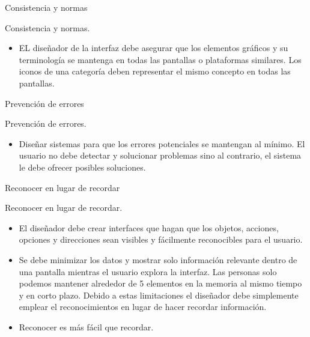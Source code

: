 \documentclass[aspectratio=169]{beamer}
\begin{document}
\begin{frame}{Consistencia y normas}
  
  \begin{block}{Consistencia y normas.}
  \begin{itemize}    
    \item EL diseñador de la interfaz debe asegurar que los elementos gráficos y su terminología se mantenga en todas las pantallas o plataformas similares. Los iconos de una categoría deben representar el mismo concepto en todas las pantallas.


  \end{itemize}
  \end{block}

\end{frame}
\begin{frame}{Prevención de errores}
  
  \begin{block}{Prevención de errores.}
  \begin{itemize}    
    \item Diseñar sistemas para que los errores potenciales se mantengan al mínimo. El usuario no debe detectar y solucionar problemas sino al contrario, el sistema le debe ofrecer posibles soluciones.

  \end{itemize}
  \end{block}

\end{frame}
\begin{frame}{Reconocer en lugar de recordar}
  
  \begin{block}{Reconocer en lugar de recordar.}
  \begin{itemize}    
    \item El diseñador debe crear interfaces que hagan que los objetos, acciones, opciones y direcciones sean visibles y fácilmente reconocibles para el usuario.
    
    \item Se debe minimizar los datos y mostrar solo información relevante dentro de una pantalla mientras el usuario explora la interfaz. Las personas solo podemos mantener alrededor de 5 elementos en la memoria al mismo tiempo y en corto plazo. Debido a estas limitaciones el diseñador debe simplemente emplear el reconocimientos en lugar de hacer recordar información.
    
    \item Reconocer es más fácil que recordar.

  \end{itemize}
  \end{block}

\end{frame}
\end{document}
